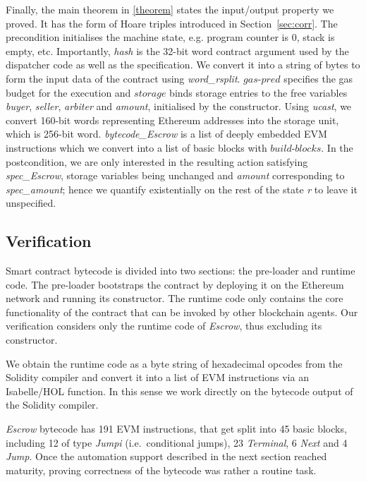 \documentclass[sigplan,10pt]{acmart}\settopmatter{printfolios=true,printccs=false,printacmref=false}
\newcommand{\gaspred}{\mathit{gas\mbox{-}pred}}
\newcommand{\storage}{\mathit{storage}}
\newcommand{\bblocks}{\mathit{build\mbox{-}blocks}}
\begin{document}
Finally, the main theorem in \autoref{theorem} states the input/output 
property we proved.
It has the form of Hoare triples introduced in Section~\ref{sec:corr}.
The precondition initialises the machine state, e.g. program counter is $0$,
stack is empty, etc.
Importantly, \textit{hash} is the 32-bit word contract
argument used by the dispatcher code as well as the specification.
We convert it into a string of bytes to form the input data of the contract
using \textit{word\_rsplit}.
$\gaspred$ specifies the gas budget for the execution and $\storage$
binds storage entries to the free variables \textit{buyer}, \textit{seller},
\textit{arbiter} and \textit{amount}, initialised by the constructor.
Using \textit{ucast}, we convert 160-bit words representing Ethereum
addresses into the storage unit, which is 256-bit word.
\textit{bytecode\_Escrow} is a list of deeply embedded EVM
instructions which we convert into a list of basic blocks with $\bblocks$.
In the postcondition, we are only interested in the resulting action
satisfying \textit{spec\_Escrow}, storage variables being unchanged
and \textit{amount} corresponding to \textit{spec\_amount};
hence we quantify existentially on the rest of the state \textit{r}
to leave it unspecified.

\subsection{Verification}
\label{sec:verif}
Smart contract bytecode is divided into two sections: the pre-loader and
runtime code.
The pre-loader bootstraps the contract by deploying it on the
Ethereum network and running its constructor.
The runtime code only contains the core functionality of the contract
that can be invoked by other blockchain agents.
Our verification considers only the runtime code of \textit{Escrow},
thus excluding its constructor.

We obtain the runtime code as a byte string of hexadecimal opcodes
from the Solidity compiler and convert it into a list of EVM instructions via an
Isabelle/HOL function.
In this sense we work directly on the bytecode output of
the Solidity compiler.

\textit{Escrow} bytecode has 191 EVM instructions, that get split into 45 basic
blocks, including 12 of type \textit{Jumpi} (i.e.\ conditional jumps),
23 \textit{Terminal}, 6 \textit{Next} and 4 \textit{Jump}.
Once the automation support described in the next section reached maturity,
proving correctness of the bytecode was rather a routine task. %
\end{document}
